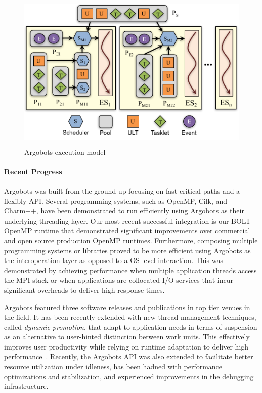 \begin{figure}[htb]
  \centering
  \includegraphics[height=3in]{projects/2.3.1-PMR/2.3.1.13-SOLLVE/SOLLVE-ARGOBOTS.pdf}
  \caption{\label{fig:sollve-argobots}Argobots execution model}
\end{figure}


\paragraph{Recent Progress}

Argobots was built from the ground up focusing on fast critical paths
and a flexibly API. Several programming systems, such as OpenMP, Cilk,
and Charm++, have been demonstrated to run efficiently using Argobots
as their underlying threading layer. Our most recent successful
integration is our BOLT OpenMP runtime that demonstrated significant
improvements over commercial and open source production OpenMP
runtimes. Furthermore, composing multiple programming systems or
libraries proved to be more efficient using Argobots as the
interoperation layer as opposed to a OS-level interaction. This was
demonstrated by achieving performance when multiple application
threads access the MPI stack or when applications are collocated I/O
services that incur significant overheads to deliver high response
times.

Argobots featured three software releases and publications in top tier
venues in the field. It has been recently extended with new thread
management techniques, called \emph{dynamic promotion}, that adapt to
application needs in terms of suspension as an alternative to
user-hinted distinction between work units. This effectively improves
user productivity while relying on runtime adaptation to deliver high
performance~\cite{iwasaki2018}. Recently, the Argobots API was also
extended to facilitate better resource utilization under idleness, has
been hadned with performance optimizations and stabilization, and
experienced improvements in the debugging infrastructure.

